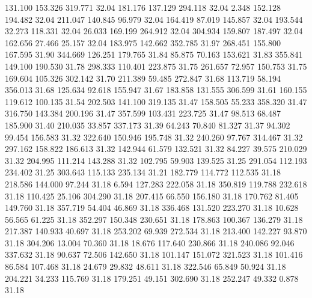  131.100  153.326  319.771        32.04
 181.176  137.129  294.118        32.04
   2.348  152.128  194.482        32.04
 211.047  140.845   96.979        32.04
 164.419   87.019  145.857        32.04
 193.544   32.273  118.331        32.04
  26.033  169.199  264.912        32.04
 304.934  159.807  187.497        32.04
 162.656   27.466   25.157        32.04
 183.975  142.662  352.785        31.97
 268.451  155.800  167.595        31.90
 344.669  126.251  179.765        31.84
  85.875   70.163  153.621        31.83
 355.841  149.100  190.530        31.78
 298.333  110.401  223.875        31.75
 261.657   72.957  150.753        31.75
 169.604  105.326  302.142        31.70
 211.389   59.485  272.847        31.68
 113.719   58.194  356.013        31.68
 125.634   92.618  155.947        31.67
 183.858  131.555  306.599        31.61
 160.155  119.612  100.135        31.54
 202.503  141.100  319.135        31.47
 158.505   55.233  358.320        31.47
 316.750  143.384  200.196        31.47
 357.599  103.431  223.725        31.47
  98.513   68.487  185.900        31.40
 210.035   33.857  337.173        31.39
  64.243   70.840   81.327        31.37
  94.302   99.454  156.583        31.32
 322.640  150.946  195.748        31.32
 240.260   97.767  314.467        31.32
 297.162  158.822  186.613        31.32
 142.944   61.579  132.521        31.32
  84.227   39.575  210.029        31.32
 204.995  111.214  143.288        31.32
 102.795   59.903  139.525        31.25
 291.054  112.193  234.402        31.25
 303.643  115.133  235.134        31.21
 182.779  114.772  112.535        31.18
 218.586  144.000   97.244        31.18
   6.594  127.283  222.058        31.18
 350.819  119.788  232.618        31.18
 110.425   25.106  304.290        31.18
 207.415   66.550  156.180        31.18
 170.762   81.405  149.760        31.18
 357.719   54.404   46.869        31.18
 336.468  131.520  223.270        31.18
  10.628   56.565   61.225        31.18
 352.297  150.348  230.651        31.18
 178.863  100.367  136.279        31.18
 217.387  140.933   40.697        31.18
 253.202   69.939  272.534        31.18
 213.400  142.227   93.870        31.18
 304.206   13.004   70.360        31.18
  18.676  117.640  230.866        31.18
 240.086   92.046  337.632        31.18
  90.637   72.506  142.650        31.18
 101.147  151.072  321.523        31.18
 101.416   86.584  107.468        31.18
  24.679   29.832   48.611        31.18
 322.546   65.849   50.924        31.18
 204.221   34.233  115.769        31.18
 179.251   49.151  302.690        31.18
 252.247   49.332    0.878        31.18
